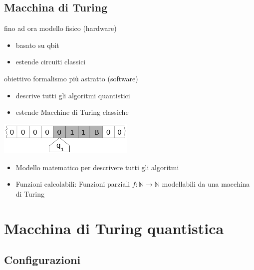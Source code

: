 \documentclass{beamer}
\begin{document}
\subsection{Macchina di Turing}
\begin{frame}{\subsecname}{}
\begin{block}{fino ad ora}
modello fisico (hardware) 
\begin{itemize}
\item basato su qbit 
\item estende circuiti classici 
\end{itemize}
\end{block}

\pause \vspace{2ex}

\begin{block}{obiettivo}
formalismo più astratto (software) 
\begin{itemize}
\item descrive tutti gli algoritmi quantistici
\item estende Macchine di Turing classiche 
\end{itemize}
\end{block}
\end{frame}

\begin{frame}{\subsecname}{}
	\centering\includegraphics[width=6.5cm]{Turing_machine_2b.png}
	\begin{itemize}
		\item<+-> Modello matematico per descrivere tutti gli algoritmi
		\item<+-> \alert{Funzioni calcolabili}: Funzioni parziali \( f : \mathbb{N} \rightarrow \mathbb{N} \) modellabili da una macchina di Turing
	\end{itemize}
\end{frame}

\section{Macchina di Turing quantistica}

\subsection{Configurazioni}
\end{document}
